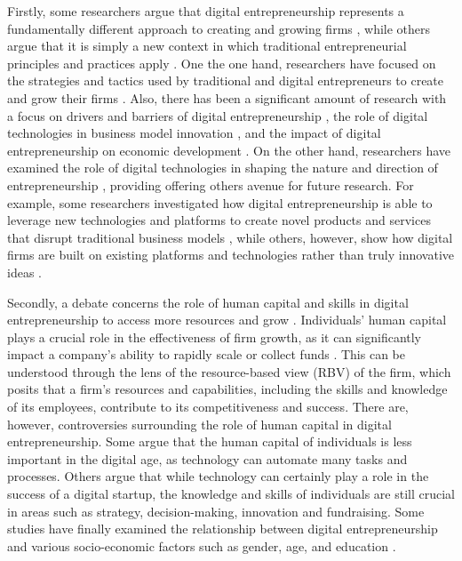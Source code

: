 \documentclass[12pt]{article}
\begin{document}
Firstly, some researchers argue that digital entrepreneurship represents a fundamentally different approach to creating and growing firms \citep{song2019digital, cavallo2019fostering}, while others argue that it is simply a new context in which traditional entrepreneurial principles and practices apply \citep{zaheer2019digital}. One the one hand, researchers have focused on the strategies and tactics used by traditional and digital entrepreneurs to create and grow their firms \citep{van2016pipelines, piaskowska2021scale}. Also, there has been a significant amount of research with a focus on drivers and barriers of digital entrepreneurship \citep{klein2020start, nambisan2019digital, autio2018digital}, the role of digital technologies in business model innovation \citep{zhao2020evolution}, and the impact of digital entrepreneurship on economic development \citep{elia2020digital}. On the other hand, researchers have examined the role of digital technologies in shaping the nature and direction of entrepreneurship \citep{nambisan2017digital, zaheer2019digital}, providing offering others avenue for future research. For example, some researchers investigated how digital entrepreneurship is able to leverage new technologies and platforms to create novel products and services that disrupt traditional business models \citep{ofe2018building, zhao2020evolution}, while others, however, show how digital firms are built on existing platforms and technologies rather than truly innovative ideas \citep{smith2005existing}.

Secondly, a debate concerns the role of human capital and skills in digital entrepreneurship to access more resources and grow \citep{gruber2012minds, marvel2016human, ratzinger2018impact}. Individuals' human capital plays a crucial role in the effectiveness of firm growth, as it can significantly impact a company's ability to rapidly scale or collect funds \citep{subramanian2022backing}. This can be understood through the lens of the resource-based view (RBV) of the firm, which posits that a firm's resources and capabilities, including the skills and knowledge of its employees, contribute to its competitiveness and success. There are, however, controversies surrounding the role of human capital in digital entrepreneurship. Some argue that the human capital of individuals is less important in the digital age, as technology can automate many tasks and processes. Others argue that while technology can certainly play a role in the success of a digital startup, the knowledge and skills of individuals are still crucial in areas such as strategy, decision-making, innovation and fundraising. Some studies have finally examined the relationship between digital entrepreneurship and various socio-economic factors such as gender, age, and education \citep{ratzinger2018impact, zaheer2019straight}.
\end{document}
